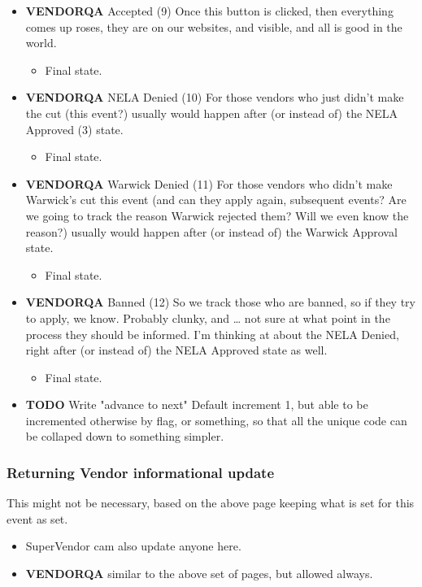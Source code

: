 \documentclass[captions=tablesignature]{scrartcl}
\begin{document}
\begin{itemize}
\item {\bfseries\sffamily VENDORQA} Accepted (9)
\label{sec-3-1-5-8}
Once this button is clicked, then everything comes up roses, they
are on our websites, and visible, and all is good in the world.
\begin{itemize}
\item Final state.
\end{itemize}

\item {\bfseries\sffamily VENDORQA} NELA Denied (10)
\label{sec-3-1-5-9}
For those vendors who just didn't make the cut (this event?)
usually would happen after (or instead of) the NELA Approved (3)
state.
\begin{itemize}
\item Final state.
\end{itemize}

\item {\bfseries\sffamily VENDORQA} Warwick Denied (11)
\label{sec-3-1-5-10}
For those vendors who didn't make Warwick's cut this event (and
can they apply again, subsequent events?  Are we going to track
the reason Warwick rejected them?  Will we even know the reason?)
usually would happen after (or instead of) the Warwick Approval
state.
\begin{itemize}
\item Final state.
\end{itemize}

\item {\bfseries\sffamily VENDORQA} Banned (12)
\label{sec-3-1-5-11}
So we track those who are banned, so if they try to apply, we
know.  Probably clunky, and \ldots{} not sure at what point in the
process they should be informed.  I'm thinking at about the NELA
Denied, right after (or instead of) the NELA Approved state as
well.
\begin{itemize}
\item Final state.
\end{itemize}

\item {\bfseries\sffamily TODO} Write "advance to next"
\label{sec-3-1-5-12}
Default increment 1, but able to be incremented otherwise by
flag, or something, so that all the unique code can be collaped
down to something simpler.
\end{itemize}

\subsubsection{Returning Vendor informational update}
\label{sec-3-1-6}
This might not be necessary, based on the above page keeping what
is set for this event as set.
\begin{itemize}
\item SuperVendor cam also update anyone here.
\end{itemize}
\begin{itemize}
\item {\bfseries\sffamily VENDORQA} similar to the above set of pages, but allowed always.
\label{sec-3-1-6-1}
\end{itemize}
\end{document}
